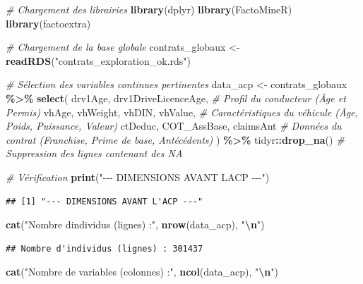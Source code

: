 \documentclass[
]{article}
\newenvironment{Shaded}{\begin{snugshade}}{\end{snugshade}}
\newcommand{\CommentTok}[1]{\textcolor[rgb]{0.56,0.35,0.01}{\textit{#1}}}
\newcommand{\FunctionTok}[1]{\textcolor[rgb]{0.13,0.29,0.53}{\textbf{#1}}}
\newcommand{\NormalTok}[1]{#1}
\newcommand{\OtherTok}[1]{\textcolor[rgb]{0.56,0.35,0.01}{#1}}
\newcommand{\SpecialCharTok}[1]{\textcolor[rgb]{0.81,0.36,0.00}{\textbf{#1}}}
\newcommand{\StringTok}[1]{\textcolor[rgb]{0.31,0.60,0.02}{#1}}
\begin{document}
\begin{Shaded}
\begin{Highlighting}[]
\CommentTok{\# Chargement des librairies}
\FunctionTok{library}\NormalTok{(dplyr)}
\FunctionTok{library}\NormalTok{(FactoMineR)}
\FunctionTok{library}\NormalTok{(factoextra)}

\CommentTok{\# Chargement de la base globale}
\NormalTok{contrats\_globaux }\OtherTok{\textless{}{-}} \FunctionTok{readRDS}\NormalTok{(}\StringTok{"contrats\_exploration\_ok.rds"}\NormalTok{)}

\CommentTok{\# Sélection des variables continues pertinentes}
\NormalTok{data\_acp }\OtherTok{\textless{}{-}}\NormalTok{ contrats\_globaux }\SpecialCharTok{\%\textgreater{}\%}
  \FunctionTok{select}\NormalTok{(}
\NormalTok{    drv1Age, drv1DriveLicenceAge,    }\CommentTok{\# Profil du conducteur (Âge et Permis)}
\NormalTok{    vhAge, vhWeight, vhDIN, vhValue, }\CommentTok{\# Caractéristiques du véhicule (Âge, Poids, Puissance, Valeur)}
\NormalTok{    ctDeduc, COT\_AssBase, claimsAnt  }\CommentTok{\# Données du contrat (Franchise, Prime de base, Antécédents)}
\NormalTok{  ) }\SpecialCharTok{\%\textgreater{}\%}
\NormalTok{  tidyr}\SpecialCharTok{::}\FunctionTok{drop\_na}\NormalTok{() }\CommentTok{\# Suppression des lignes contenant des NA}

\CommentTok{\# Vérification}
\FunctionTok{print}\NormalTok{(}\StringTok{"{-}{-}{-} DIMENSIONS AVANT L\textquotesingle{}ACP {-}{-}{-}"}\NormalTok{)}
\end{Highlighting}
\end{Shaded}

\begin{verbatim}
## [1] "--- DIMENSIONS AVANT L'ACP ---"
\end{verbatim}

\begin{Shaded}
\begin{Highlighting}[]
\FunctionTok{cat}\NormalTok{(}\StringTok{"Nombre d\textquotesingle{}individus (lignes) :"}\NormalTok{, }\FunctionTok{nrow}\NormalTok{(data\_acp), }\StringTok{"}\SpecialCharTok{\textbackslash{}n}\StringTok{"}\NormalTok{)}
\end{Highlighting}
\end{Shaded}

\begin{verbatim}
## Nombre d'individus (lignes) : 301437
\end{verbatim}

\begin{Shaded}
\begin{Highlighting}[]
\FunctionTok{cat}\NormalTok{(}\StringTok{"Nombre de variables (colonnes) :"}\NormalTok{, }\FunctionTok{ncol}\NormalTok{(data\_acp), }\StringTok{"}\SpecialCharTok{\textbackslash{}n}\StringTok{"}\NormalTok{)}
\end{Highlighting}
\end{Shaded}
\end{document}
